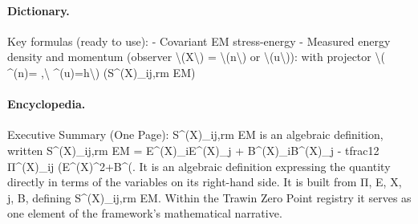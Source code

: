 \paragraph{Dictionary.}
Key formulas (ready to use): - Covariant EM stress-energy - Measured energy density and momentum (observer \textbackslash{}(X\textbackslash{}) = \textbackslash{}(n\textbackslash{}) or \textbackslash{}(u\textbackslash{})): with projector \textbackslash{}( \textasciicircum{}(n)= ,\textbackslash{} \textasciicircum{}(u)=h\textbackslash{}) (S\textasciicircum{}(X)\_ij,rm EM)

\paragraph{Encyclopedia.}
Executive Summary (One Page): S\textasciicircum{}(X)\_ij,rm EM is an algebraic definition, written S\textasciicircum{}(X)\_ij,rm EM = E\textasciicircum{}(X)\_iE\textasciicircum{}(X)\_j + B\textasciicircum{}(X)\_iB\textasciicircum{}(X)\_j - tfrac12 Π\textasciicircum{}(X)\_ij (E\textasciicircum{}(X)\textasciicircum{}2+B\textasciicircum{}(. It is an algebraic definition expressing the quantity directly in terms of the variables on its right-hand side. It is built from Π, E, X, j, B, defining S\textasciicircum{}(X)\_ij,rm EM. Within the Trawin Zero Point registry it serves as one element of the framework's mathematical narrative.
